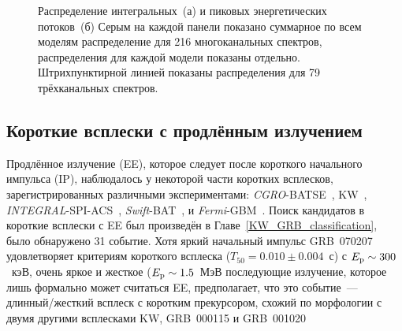 \begin{figure}
    \begin{minipage}[h]{0.5\textwidth}
    \end{minipage}
    \hfill
    \begin{minipage}[h]{0.5\textwidth}
	\end{minipage}
\caption{
    Распределение интегральных~(а) и пиковых энергетических потоков~(б)
    Серым на каждой панели показано суммарное по всем моделям распределение для 216
    многоканальных спектров, распределения для каждой модели показаны отдельно. 
    Штрихпунктирной линией показаны распределения для 79 трёхканальных спектров.
    \label{fig:fl_pf_dist} }
\end{figure}

\subsection{Короткие всплески с продлённым излучением}
Продлённое излучение (EE), которое следует после короткого начального импульса (IP),
наблюдалось у некоторой части коротких всплесков, зарегистрированных различными экспериментами:
\textit{CGRO}-BATSE~\citep{Burenin_2000AstL, Norris_and_Bonnel_2006ApJ, Bostanci_2013MNRAS}, 
KW~\citep{Mazets_2002astroph, Frederiks_2004ASPC}, 
\textit{INTEGRAL}-SPI-ACS~\citep{Minaev_2010AstL}, 
\textit{Swift}-BAT~\citep{Norris_2011ApJ, Sakamoto_2011ApJS}, 
и \textit{Fermi}-GBM~\citep{Kaneko_2015MNRAS}. 
Поиск кандидатов в короткие всплески с EE был произведён в Главе~\ref{KW_GRB_classification}, 
было обнаружено 31 событие. Хотя яркий начальный импульс GRB~070207~\citep{Golenetskii_2007GCN6089}
удовлетворяет критериям короткого всплеска ($T_{50}=0.010\pm0.004$~с) с $E_{\mathrm{p}}\sim 300$~кэВ,
очень яркое и жесткое ($E_{\mathrm{p}}\sim 1.5$~МэВ последующие излучение, которое лишь формально может
считаться EE, предполагает, что это событие~--- длинный/жесткий всплеск с коротким прекурсором,
схожий по морфологии с двумя другими всплесками KW, GRB~000115 
и GRB~001020~\citep{Hurley_2000GCN859}


